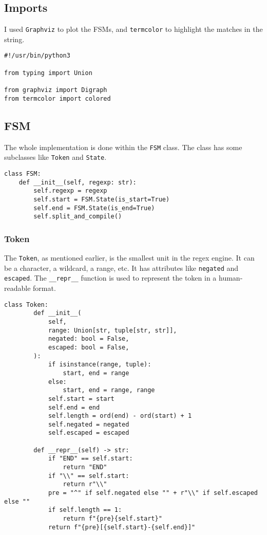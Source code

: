 \documentclass[12pt]{report}
\begin{document}
\subsection{Imports}

I used \texttt{Graphviz} to plot the FSMs, and \texttt{termcolor} to highlight the matches in the string.

\begin{lstlisting}[caption={Imports}]
#!/usr/bin/python3

from typing import Union

from graphviz import Digraph
from termcolor import colored
\end{lstlisting}

\subsection{FSM}

The whole implementation is done within the \texttt{FSM} class. The class has some subclasses like \texttt{Token} and \texttt{State}.

\begin{lstlisting}[caption={FSM}]
class FSM:
    def __init__(self, regexp: str):
        self.regexp = regexp
        self.start = FSM.State(is_start=True)
        self.end = FSM.State(is_end=True)
        self.split_and_compile()
\end{lstlisting}
\subsubsection{Token}

The \texttt{Token}, as mentioned earlier, is the smallest unit in the regex engine. It can be a character, a wildcard, a range, etc. It has attributes like \texttt{negated} and \texttt{escaped}. The \texttt{\_\_repr\_\_} function is used to represent the token in a human-readable format.

\begin{lstlisting}[caption={\texttt{FSM.Token}}]
    class Token:
        def __init__(
            self,
            range: Union[str, tuple[str, str]],
            negated: bool = False,
            escaped: bool = False,
        ):
            if isinstance(range, tuple):
                start, end = range
            else:
                start, end = range, range
            self.start = start
            self.end = end
            self.length = ord(end) - ord(start) + 1
            self.negated = negated
            self.escaped = escaped

        def __repr__(self) -> str:
            if "END" == self.start:
                return "END"
            if "\\" == self.start:
                return r"\\"
            pre = "^" if self.negated else "" + r"\\" if self.escaped else ""
            if self.length == 1:
                return f"{pre}{self.start}"
            return f"{pre}[{self.start}-{self.end}]"
\end{lstlisting}
\end{document}

